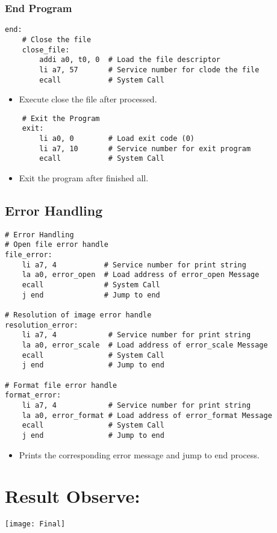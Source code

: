 \documentclass{article}
\begin{document}
\subsubsection{End Program}
\begin{verbatim}
end:
    # Close the file
    close_file:
        addi a0, t0, 0  # Load the file descriptor
        li a7, 57       # Service number for clode the file
        ecall           # System Call   
\end{verbatim}
\begin{itemize}
    \item Execute close the file after processed.
\end{itemize}
\begin{verbatim}
    # Exit the Program
    exit:
        li a0, 0        # Load exit code (0)
        li a7, 10       # Service number for exit program
        ecall           # System Call
\end{verbatim}
\begin{itemize}
    \item Exit the program after finished all.
\end{itemize}
\subsection{Error Handling}
\begin{verbatim}
# Error Handling
# Open file error handle
file_error:
    li a7, 4           # Service number for print string
    la a0, error_open  # Load address of error_open Message
    ecall              # System Call
    j end              # Jump to end

# Resolution of image error handle
resolution_error:
    li a7, 4            # Service number for print string
    la a0, error_scale  # Load address of error_scale Message 
    ecall               # System Call
    j end               # Jump to end

# Format file error handle
format_error:
    li a7, 4            # Service number for print string
    la a0, error_format # Load address of error_format Message
    ecall               # System Call
    j end               # Jump to end
\end{verbatim} 
\begin{itemize}
    \item Prints the corresponding error message and jump to end process.
\end{itemize}
\section{Result Observe:}
\texttt{[image: Final]}
\end{document}
